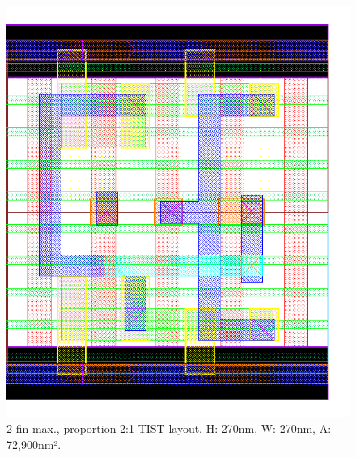 \documentclass[pgmicro,diss,english]{iiufrgs}
\begin{document}
\begin{figure}[]
\centering
\includegraphics[width=\textwidth,height=\textheight,keepaspectratio]{TIST2F1F.png}
\caption{2 fin max., proportion 2:1 TIST layout. H: 270nm, W: 270nm, A: 72,900nm².}
\label{fig:TIST1F}
\end{figure}
\end{document}
